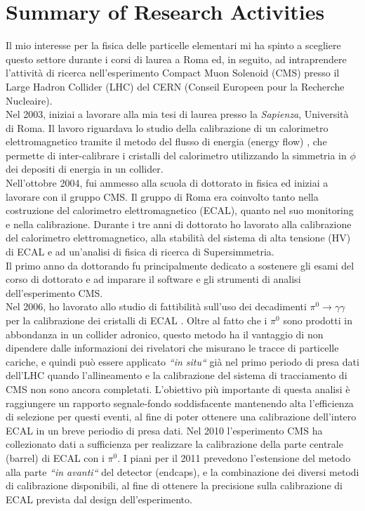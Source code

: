 \documentclass[10pt, a4paper]{article}
\begin{document}
\section*{Summary of Research Activities}
Il mio interesse per la fisica delle particelle elementari mi ha spinto a scegliere questo settore durante 
i corsi di laurea a Roma ed, in seguito, ad intraprendere l'attivit\`a di ricerca nell'esperimento 
Compact Muon Solenoid (CMS) presso il Large Hadron Collider (LHC) del CERN
(Conseil Europeen pour la Recherche Nucleaire). \\

Nel 2003, iniziai a lavorare alla mia tesi di laurea presso la \textit{Sapienza}, Universit\`a di Roma. Il lavoro riguardava lo studio della calibrazione di un calorimetro elettromagnetico tramite il metodo del flusso di energia (energy flow) \cite{Santanastasio:LAUREA}, che permette di inter-calibrare i cristalli del calorimetro utilizzando la simmetria in $\phi$ dei depositi di energia in un collider. \\

Nell'ottobre 2004, fui ammesso alla scuola di dottorato in fisica ed iniziai a lavorare con il gruppo CMS. 
Il gruppo di Roma era coinvolto tanto nella costruzione del calorimetro elettromagnetico (ECAL), quanto nel suo 
monitoring e nella calibrazione. Durante i tre anni di dottorato ho lavorato alla calibrazione del calorimetro elettromagnetico, 
alla stabilit\`a del sistema di alta tensione (HV) di ECAL e ad un'analisi di fisica di ricerca di Supersimmetria.  \\

Il primo anno da dottorando fu principalmente dedicato a sostenere gli esami del corso di dottorato e ad imparare 
il software e gli strumenti di analisi dell'esperimento CMS. \\

Nel 2006, ho lavorato allo studio di fattibilit\`a sull'uso dei decadimenti $\pi^0 \rightarrow \gamma\gamma$ per la 
calibrazione dei cristalli di ECAL \cite{DN-2007-013,IN-2006-050}. Oltre al fatto che i $\pi^0$ sono prodotti 
in abbondanza in un collider adronico, questo metodo ha il vantaggio di non dipendere dalle informazioni dei rivelatori 
che misurano le tracce di particelle cariche, e quindi pu\`o essere applicato {\it ``in situ``} gi\`a nel primo periodo di presa dati 
dell'LHC quando l'allineamento e la calibrazione del sistema di tracciamento di CMS non sono ancora completati. 
L'obiettivo pi\`u importante di questa analisi \`e raggiungere un rapporto segnale-fondo soddisfacente mantenendo alta 
l'efficienza di selezione per questi eventi, al fine di poter ottenere una calibrazione dell'intero ECAL in un breve periodio di presa dati. 
Nel 2010 l'esperimento CMS ha collezionato dati a sufficienza per realizzare la calibrazione della parte centrale (barrel) 
di ECAL con i $\pi^0$. I piani per il 2011 prevedono l'estensione del metodo alla parte {\it ``in avanti``} del detector (endcaps), 
e la combinazione dei diversi metodi di calibrazione disponibili, al fine di ottenere la precisione sulla calibrazione di ECAL 
prevista dal design dell'esperimento. \\
\end{document}

